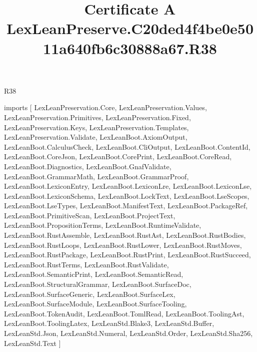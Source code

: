 \begin{lexlean}{R38}
\title{Certificate A LexLeanPreserve.C20ded4f4be0e5011a640fb6c30888a67.R38}
\begin{coremodule}
imports [
  LexLeanPreservation.Core,
  LexLeanPreservation.Values,
  LexLeanPreservation.Primitives,
  LexLeanPreservation.Fixed,
  LexLeanPreservation.Keys,
  LexLeanPreservation.Templates,
  LexLeanPreservation.Validate,
  LexLeanBoot.AxiomOutput,
  LexLeanBoot.CalculusCheck,
  LexLeanBoot.CliOutput,
  LexLeanBoot.ContentId,
  LexLeanBoot.CoreJson,
  LexLeanBoot.CorePrint,
  LexLeanBoot.CoreRead,
  LexLeanBoot.Diagnostics,
  LexLeanBoot.GnafValidate,
  LexLeanBoot.GrammarMath,
  LexLeanBoot.GrammarProof,
  LexLeanBoot.LexiconEntry,
  LexLeanBoot.LexiconLre,
  LexLeanBoot.LexiconLse,
  LexLeanBoot.LexiconSchema,
  LexLeanBoot.LockText,
  LexLeanBoot.LseScopes,
  LexLeanBoot.LseTypes,
  LexLeanBoot.ManifestText,
  LexLeanBoot.PackageRef,
  LexLeanBoot.PrimitiveScan,
  LexLeanBoot.ProjectText,
  LexLeanBoot.PropositionTerms,
  LexLeanBoot.RuntimeValidate,
  LexLeanBoot.RustAssemble,
  LexLeanBoot.RustAst,
  LexLeanBoot.RustBodies,
  LexLeanBoot.RustLoops,
  LexLeanBoot.RustLower,
  LexLeanBoot.RustMoves,
  LexLeanBoot.RustPackage,
  LexLeanBoot.RustPrint,
  LexLeanBoot.RustSucceed,
  LexLeanBoot.RustTerms,
  LexLeanBoot.RustValidate,
  LexLeanBoot.SemanticPrint,
  LexLeanBoot.SemanticRead,
  LexLeanBoot.StructuralGrammar,
  LexLeanBoot.SurfaceDoc,
  LexLeanBoot.SurfaceGeneric,
  LexLeanBoot.SurfaceLex,
  LexLeanBoot.SurfaceModule,
  LexLeanBoot.SurfaceTooling,
  LexLeanBoot.TokenAudit,
  LexLeanBoot.TomlRead,
  LexLeanBoot.ToolingAst,
  LexLeanBoot.ToolingLatex,
  LexLeanStd.Blake3,
  LexLeanStd.Buffer,
  LexLeanStd.Json,
  LexLeanStd.Numeral,
  LexLeanStd.Order,
  LexLeanStd.Sha256,
  LexLeanStd.Text
]


\end{coremodule}
\end{lexlean}
